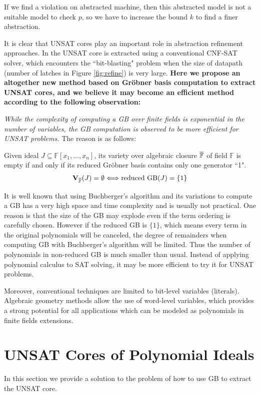 If we find a violation on abstracted machine, then this
abstracted model is not a suitable model to check $p$, so we have to increase the bound $k$ to find a finer abstraction.

It is clear that UNSAT cores play an important role in abstraction refinement approaches. In \cite{zhang2005design}
the UNSAT core is extracted using a conventional CNF-SAT solver, which encounters the ``bit-blasting" problem
when the size of datapath (number of latches in Figure \ref{fig:refine}) is very large. \textbf{Here we propose an altogether new 
method based on Gr\"obner basis computation to extract UNSAT cores, and we believe it may become an efficient 
method according to the following observation:}

{\it While the complexity of computing a GB over finite fields is exponential in the number of variables,
the GB  computation is observed to be more efficient for UNSAT problems.} 
The reason is as follows:
\begin{Theorem}
Given ideal $J\subseteq \mathbb F[x_1,\dots,x_n]$, its variety over algebraic closure $\overline{{\mathbb{F}}}$
of field $\mathbb F$ is empty if and only if its reduced Gr\"obner basis contains only one generator ``1".
$${\bf V}_{\overline{\mathbb F}}(J) = \emptyset \Longleftrightarrow \text{reduced GB}(J) = \{1\}$$
\end{Theorem}
It is well known that using Buchberger's algorithm and its variations to compute a GB has a very high space and
time complexity and is usually not practical. One reason is that the size of the GB may explode even if the term
ordering is carefully chosen. However if the reduced GB is $\{1\}$, which means every term in the original polynomials
will be canceled, the degree of remainders when computing GB with Buchberger's algorithm will be limited. 
Thus the number of polynomials in non-reduced GB is much smaller than usual.
Instead of applying polynomial calculus to SAT solving, it may be more efficient to try it for UNSAT
problems.

Moreover, conventional techniques are limited to bit-level variables (literals). Algebraic geometry methods
allow the use of word-level variables, which provides a strong potential for all applications which can be
modeled as polynomials in finite fields extensions.

\section{UNSAT Cores of Polynomial Ideals}
\label{sec:core}
In this section we provide a solution to the problem of how to use 
GB to extract the UNSAT core. 

